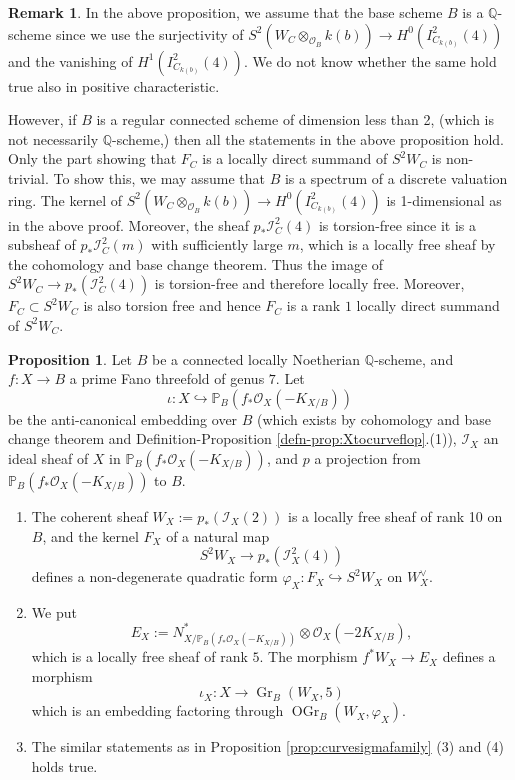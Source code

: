 \documentclass[autodetect-engine, a4paper]{amsart}
\theoremstyle{definition}
\newtheorem{prop}[thm]{Proposition}
\newtheorem{rem}[thm]{Remark}
\def\P{{\mathbb P}}
\def\Q{{\mathbb Q}}
\def\cO{\mathcal{O}}
\DeclareMathOperator\Gr{\mathrm{Gr}}
\DeclareMathOperator\OGr{\mathrm{OGr}}
\newcommand{\cred}{\color{black}}
\newcommand{\cora}{\color{black}}
\begin{document}
{\cora
\begin{rem}
\label{rem:basedvr}
In the above proposition, we assume that the base scheme $B$ is a $\Q$-scheme since we use the surjectivity of $S^2(W_{C}\otimes_{\cO_B} k(b)) \rightarrow H^0(I_{C_{k(b)}}^2(4))$ and the vanishing of $H^1 (I_{C_{k(b)}}^2(4))$. We do not know whether the same hold true also in positive characteristic.

However, if $B$ is a regular connected scheme of dimension less than 2, (which is not necessarily $\Q$-scheme,) then all the statements in the above proposition hold.
Only the part showing that $F_{C}$ is a locally direct summand of $S^2 W_C$ is non-trivial. To show this, we may assume that $B$ is a spectrum of a discrete valuation ring.
The kernel of $S^2(W_{C}\otimes_{\cO_B} k(b)) \rightarrow H^0(I_{C_{k(b)}}^2(4))$ is 1-dimensional as in the above proof.
Moreover, the sheaf $p_* \mathcal{I}^2_{C}(4)$ is torsion-free since it is a subsheaf of $p_* \mathcal{I}^2_{C}(m)$ with sufficiently large $m$, which is a locally free sheaf by the cohomology and base change theorem.
Thus the image of $S^2 W_{C} \rightarrow p_*(\mathcal{I}^2_{C} (4))$ is torsion-free and therefore locally free.
Moreover, $F_{C} \subset S^2 W_{C}$ is also torsion free and hence $F_C$ is a rank $1$ locally direct summand of $S^2 W_{C}$.
\end{rem}
}

\begin{prop}
\label{prop:Xsigmafamily}
Let $B$ be a {\cred connected locally Noetherian} $\Q$-scheme, and $f\colon X \rightarrow B$ a prime Fano threefold of genus $7$.
Let 
\[
\iota \colon
X \hookrightarrow \P_{B}( f_{\ast} \cO_{X} (- K_{X/B}))
\]
be the anti-canonical embedding over $B$ (which exists by cohomology and base change theorem and Definition-Proposition \ref{defn-prop:Xtocurveflop}.(1)),
{\cred $\mathcal{I}_{X}$ an ideal sheaf of $X$ in $\P_{B}(f_{\ast} \cO_{X} (-K_{X/B}))$,}
and $p$ a projection from
$\P_{B}(f_{\ast} \cO_{X}(-K_{X/B}))$ to $B$.
\begin{enumerate}
\item
The coherent sheaf $W_{X}:= p_{\ast} (\mathcal{I}_{X} (2))$ is a locally free sheaf of rank 10 on $B$,
and the kernel $F_{X}$ of a natural map
\[
S^{2} W_{X} \rightarrow p_{\ast} (\mathcal{I}_{X}^{2} (4))
\]
{\cred defines a non-degenerate quadratic form $\varphi_{X} \colon F_{X} \hookrightarrow S^2 W_{X}$ on $W_{X}^{\vee}$.}
\item 
We put 
\[
E_{X} := N_{X/\P_{B}(f_{\ast}\cO_{X}(-K_{X/B}))}^{\ast} \otimes \cO_{X}(-2 K_{X/B}),
\]
which is a locally free sheaf of rank $5$.
The morphism $f^{\ast} W_{X} \rightarrow E_{X}$ defines a morphism 
\[
\iota_{X} \colon X \rightarrow \Gr_B (W_{X}, 5) 
\]
which is an embedding factoring through $\OGr_B(W_{X}, \varphi_{X})$.
\item
The similar statements as in Proposition \ref{prop:curvesigmafamily} (3) and (4) holds true.
\end{enumerate}
\end{prop}
\end{document}
